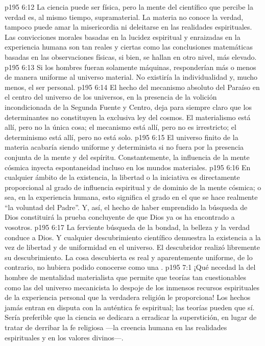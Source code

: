 \vs p195 6:12 La ciencia puede ser física, pero la mente del científico que percibe la verdad es, al mismo tiempo, supramaterial. La materia no conoce la verdad, tampoco puede amar la misericordia ni deleitarse en las realidades espirituales. Las convicciones morales basadas en la lucidez espiritual y enraizadas en la experiencia humana son tan reales y ciertas como las conclusiones matemáticas basadas en las observaciones físicas, si bien, se hallan en otro nivel, más elevado.
\vs p195 6:13 Si los hombres fueran solamente máquinas, responderían más o menos de manera uniforme al universo material. No existiría la individualidad y, mucho menos, el ser personal.
\vs p195 6:14 \pc El hecho del mecanismo absoluto del Paraíso en el centro del universo de los universos, en la presencia de la volición incondicionada de la Segunda Fuente y Centro, deja para siempre claro que los determinantes no constituyen la exclusiva ley del cosmos. El materialismo está allí, pero no la única cosa; el mecanismo está allí, pero no es irrestricto; el determinismo está allí, pero no está solo.
\vs p195 6:15 El universo finito de la materia acabaría siendo uniforme y determinista si no fuera por la presencia conjunta de la mente y del espíritu. Constantemente, la influencia de la mente cósmica inyecta espontaneidad incluso en los mundos materiales.
\vs p195 6:16 En cualquier ámbito de la existencia, la libertad o la iniciativa es directamente proporcional al grado de influencia espiritual y de dominio de la mente cósmica; o sea, en la experiencia humana, esto significa el grado en el que se hace realmente “la voluntad del Padre”. Y, así, el hecho de haber emprendido la búsqueda de Dios constituirá la prueba concluyente de que Dios ya os ha encontrado a vosotros.
\vs p195 6:17 La ferviente búsqueda de la bondad, la belleza y la verdad conduce a Dios. Y cualquier descubrimiento científico demuestra la existencia a la vez de libertad y de uniformidad en el universo. El descubridor realizó libremente su descubrimiento. La cosa descubierta es real y aparentemente uniforme, de lo contrario, no hubiera podido conocerse como una .
\vs p195 7:1 ¡Qué necedad la del hombre de mentalidad materialista que permite que teorías tan cuestionables como las del universo mecanicista lo despoje de los inmensos recursos espirituales de la experiencia personal que la verdadera religión le proporciona! Los hechos jamás entran en disputa con la auténtica fe espiritual; las teorías pueden que sí. Sería preferible que la ciencia se dedicara a erradicar la superstición, en lugar de tratar de derribar la fe religiosa ---la creencia humana en las realidades espirituales y en los valores divinos---.
